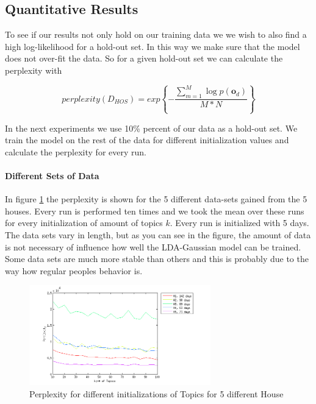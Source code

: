\documentclass[11pt,a4paper]{article}
\begin{document}
\pagebreak


\subsection{Quantitative Results}
To see if our results not only hold on our training data we we wish to also find a high log-likelihood for a hold-out set. In this way we make sure that the model does not over-fit the data. So for a given hold-out set we can calculate the perplexity with 

\begin{equation}
 perplexity(D_{HOS}) = exp \left\{ - \frac{\sum_{m=1}^M \log p(\textbf{o}_d ) }{M*N} \right\}
\end{equation}

In the next experiments we use 10\% percent of our data as a hold-out set. We train the model on the rest of the data for different initialization values and calculate the perplexity for every run.

\paragraph{Different Sets of Data}
In figure \ref{fig:PerplGaus} the perplexity is shown for the 5 different data-sets gained from the 5 houses. Every run is performed ten times and we took the mean over these runs for every initialization of amount of topics $k$. Every run is initialized with 5 days.
The data sets vary in length, but as you can see in the figure, the amount of data is not necessary of influence how well the LDA-Gaussian model can be trained. Some data sets are much more stable than others and this is probably due to the way how regular peoples behavior is.

\begin{figure}[h!]
 \centering
 \includegraphics[width=0.7\textwidth]{Pictures/PerplGaus.png}
 \caption{Perplexity for different initializations of Topics for 5 different House}
 \label{fig:PerplGaus}
\end{figure}
\end{document}
